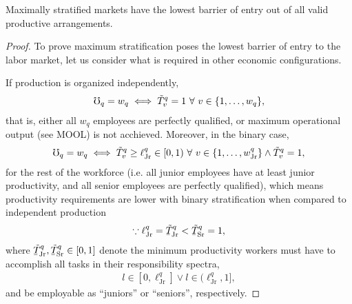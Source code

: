 \documentclass[hidelinks, nonatbib]{elsarticle}
\begin{document}
\begin{lemma}
    \label{mpl}
    Maximally stratified markets have the lowest barrier of entry out of all valid productive arrangements.
    
    \begin{proof}
        To prove maximum stratification poses the lowest barrier of entry to the labor market, let us consider what is required in other economic configurations.
        
        If production is organized independently,
        \begin{gather}
        \mho_q = w_q
        \iff
        \tilde{T}_{v}^{q}
        =
        1
        \
        \forall
        \
        v \in \{1, \dots, w_q\}
        ,
        \end{gather}
        that is, either all $w_q$ employees are perfectly qualified, or maximum operational output (see MOOL) is not acchieved. Moreover, in the binary case,
        \begin{gather}
        \mho_q = w_q
        \iff
        \tilde{T}_{v}^{q}
        \geq
        \ell_{\text{Jr}}^{q}
        \in
        [0,1)
        \
        \forall
        \
        v \in \{1, \dots, w_{\text{Jr}}^{q}\}
        \land
        \tilde{T}_{v}^{q}
        =
        1
        ,
        \end{gather}
        for the rest of the workforce (i.e. all junior employees have at least junior productivity, and all senior employees are perfectly qualified), which means productivity requirements are lower with binary stratification when compared to independent production
        \begin{gather}
            \because
            \ell_{\text{Jr}}^{q}
            =
            \underaccent{\bar}{\tilde{T}}_{\text{Jr}}^{q}
            <
            \underaccent{\bar}{\tilde{T}}_{\text{Sr}}^{q}
            = 1
            ,
        \end{gather}
        where $\underaccent{\bar}{\tilde{T}}_{\text{Jr}}^{q}, \underaccent{\bar}{\tilde{T}}_{\text{Sr}}^{q} \in [0,1]$ denote the minimum productivity workers must have to accomplish all tasks in their responsibility spectra,
        \begin{gather}
            l \in [0, \ell_{\text{Jr}}^{q}]
            \lor
            l \in (\ell_{\text{Jr}}^{q}, 1]
            ,
        \end{gather}
        and be employable as ``juniors'' or ``seniors'', respectively.


\end{proof}
\end{lemma}
\end{document}
